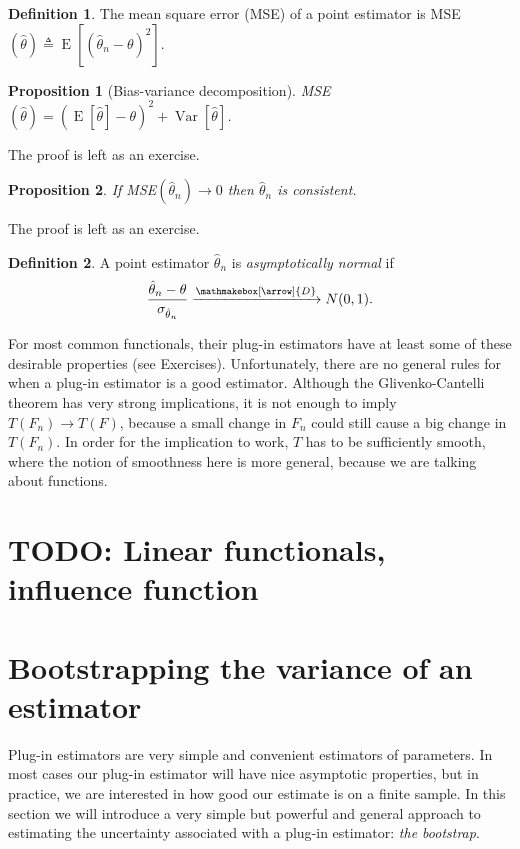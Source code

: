 \documentclass{book}
\theoremstyle{plain}%
\newtheorem{proposition}{Proposition}[section]
\theoremstyle{definition}
\newtheorem{definition}{Definition}[section]
\DeclareMathOperator{\Var}{Var}
\DeclareMathOperator{\E}{E}
\newlength{\arrow}
\newcommand*{\myrightarrow}[1]{\xrightarrow{\mathmakebox[\arrow]{#1}}}
\begin{document}
\begin{definition} The mean square error (MSE) of a point estimator is
MSE$(\hat{\theta}) \triangleq \E[(\hat{\theta}_n - \theta)^2]$.
\end{definition}

\begin{proposition}[Bias-variance decomposition] MSE$(\hat{\theta}) = (\E[\hat{\theta}] - \theta)^2 + \Var[\hat{\theta}]$.\label{prop:biasvar}
\end{proposition}

The proof is left as an exercise.

\begin{proposition} If MSE$(\hat{\theta}_n) \rightarrow 0$ then $\hat{\theta}_n$ is consistent.\label{prop:consistent}
\end{proposition}

The proof is left as an exercise.

\begin{definition} A point estimator $\hat{\theta}_n$  is \textit{asymptotically normal} if $$\frac{\hat{\theta}_n - \theta}{\sigma_{\hat{\theta}_n}} \myrightarrow{D} N(0,1).$$
\end{definition}

For most common functionals, their plug-in estimators have at least some of these desirable properties (see Exercises). Unfortunately, there are no general rules for when a plug-in estimator is a good estimator. Although the Glivenko-Cantelli theorem has very strong implications, it is not enough to imply $T(F_n) \rightarrow T(F)$, because a small change in $F_n$ could still cause a big change in $T(F_n)$. In order for the implication to work, $T$ has to be sufficiently smooth, where the notion of smoothness here is more general, because we are talking about functions.

\section{TODO: Linear functionals, influence function}

\section{Bootstrapping the variance of an estimator}

Plug-in estimators are very simple and convenient estimators of parameters. In most cases our plug-in estimator will have nice asymptotic properties, but in practice, we are interested in how good our estimate is on a finite sample. In this section we will introduce a very simple but powerful and general approach to estimating the uncertainty associated with a plug-in estimator: \textit{the bootstrap}.
\end{document}
